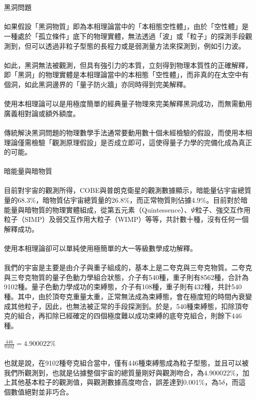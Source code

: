 \documentclass[a4paper,notitlepage,UTF8]{ctexart}
\begin{document}
\\
\\
黑洞問題
\\
\\
如果假設「黑洞物質」即為本相理論當中的「本相態空性體」，由於「空性體」是一種處於「孤立條件」底下的物理實體，無法透過「波」或「粒子」的探測手段觀測到，但可以透過非粒子型態的長程力或是弱測量方法來探測到，例如引力波。
\\
\\
如此，黑洞無法被觀測，但具有強引力的本質，立刻得到物理本質性的正確解釋，即「黑洞」的物理實體是本相理論當中的本相態「空性體」，而非真的在太空中有個洞，如此黑洞邊界的「量子防火牆」亦同時得到完美解釋。
\\
\\
使用本相理論可以是用極度簡單的經典量子物理來完美解釋黑洞成功，而無需動用廣義相對論或額外額度。
\\
\\
傳統解決黑洞問題的物理數學手法通常要動用數十個未經檢驗的假設，而使用本相理論僅需檢驗「觀測原理假設」是否成立即可，這使得量子力學的完備化成為真正的可能。
\\
\\
暗能量與暗物質
\\
\\
目前對宇宙的觀測所得，COBE與普朗克衛星的觀測數據顯示，暗能量佔宇宙總質量的68.3\%，暗物質佔宇宙總質量的26.8\%，而正常物質則佔據4.9\%。目前對於暗能量與暗物質的物理實體組成，從第五元素（Quintessence）、$\Psi$粒子、強交互作用粒子（SIMP）及弱交互作用大粒子（WIMP）等等，共計數十種，沒有任何一個解釋成功。
\\
\\
使用本相理論卻可以單純使用極簡單的大一等級數學成功解釋。
\\
\\
我們的宇宙是主要是由介子與重子組成的，基本上是二夸克與三夸克物質。二夸克與三夸克物質的量子色動力學組合狀態，介子有540種，重子則有8562種，合計為9102種。量子色動力學成功的束縛態，介子有108種，重子則有432種，共計540種。其中，由於頂夸克重量太重，正常無法成為束縛態，會在極度短的時間內衰變成其他粒子，因此，也無法被正常的手段探測到。於是，540種束縛態，扣除頂夸克的組合，再扣除已經確定的四個極度難以成功束縛的底夸克組合，則餘下446種。
\\
\\
$\frac{446}{9102} = 4.900022\%$
\\
\\
也就是說，在9102種夸克組合當中，僅有446種束縛態成為粒子型態，並且可以被我們所觀測到，也就是佔據整個宇宙的總質量剛好與觀測吻合，為$4.900022\%$，加上其他基本粒子的觀測值，與觀測數據高度吻合，誤差達到0.001\%，為$5\delta$，而這個數值絕對並非巧合。
\end{document}

